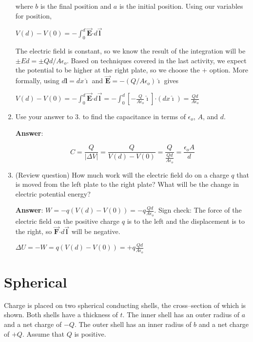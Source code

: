 \documentclass{article}
\newcommand{\ds}[0]{\displaystyle}
\newcommand{\ihat}[0]{\hat{\boldsymbol{\imath}}}
\newcommand{\bfvec}[1]{\vec{\mathbf{#1}}}
\newcommand{\bfcdot}[0]{\boldsymbol{\cdot}}
\begin{document}
\begin{enumerate}
        where $b$ is the final position and $a$ is the initial position. Using our variables for position,

        $\ds V(d)-V(0) = -\int_0^d\bfvec{E}\bfcdot d\bfvec{l}$

        The electric field is constant, so we know the result of the integration will be $\pm Ed=\pm Qd/A\epsilon_o$. Based on techniques covered in the last activity, we expect the potential to be higher at the right plate, so we choose the $+$ option. More formally, using $d\mathbf{l}=dx\ihat$  and $\bfvec{E}=-({Q}/{A\epsilon_o})\ihat$ gives

        $\ds V(d)-V(0) = -\int_0^d\bfvec{E}\bfcdot d\bfvec{l}=-\int_0^d\left[-\frac{Q}{A\epsilon_o}\ihat\right]\bfcdot (dx\ihat)=\frac{Qd}{A\epsilon_o}$
        \else
        \vskip 36pt
        \fi

  \item Use your answer to 3. to find the capacitance in terms of $\epsilon_o$, $A$, and $d$.

        \ifsolutions
        {\bf Answer}:

        $$C = \frac{Q}{|\Delta V|} = \frac{Q}{V(d)-V(0)} = \frac{Q}{\frac{Qd}{A\epsilon_o}}=\frac{\epsilon_oA}{d}$$
        \else
        \vskip 36pt
        \fi

  \item (Review question) How much work will the electric field do on a charge $q$ that is moved from the left plate to the right plate? What will be the change in electric potential energy?

        \ifsolutions
        {\bf Answer}: $\ds W=-q(V(d)-V(0))=-q\frac{Qd}{A\epsilon_o}$. Sign check: The force of the electric field on the positive charge $q$ is to the left and the displacement is to the right, so $\bfvec{F}\bfcdot d\bfvec{l}$ will be negative.

        $\ds\Delta U=-W=q(V(d)-V(0))=+q\frac{Qd}{A\epsilon_o}$
        \else
        \vskip 36pt
        \fi

\end{enumerate}

\section{Spherical}

Charge is placed on two spherical conducting shells, the cross--section of which is shown. Both shells have a thickness of $t$. The inner shell has an outer radius of $a$ and a net charge of $-Q$. The outer shell has an inner radius of $b$ and a net charge of $+Q$. Assume that $Q$ is positive.
\end{document}
